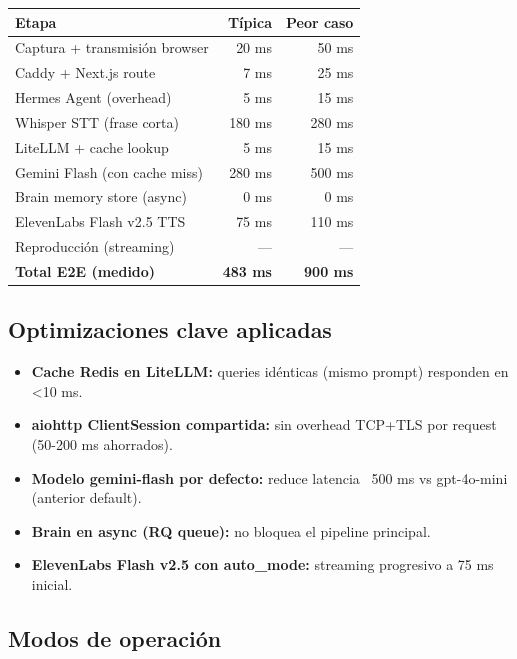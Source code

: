 \documentclass[11pt,a4paper]{article}
\begin{document}
\begin{center}
\begin{tabular}{|l|r|r|}
\hline
\rowcolor{hermesblue}\color{white}\textbf{Etapa} & \color{white}\textbf{Típica} & \color{white}\textbf{Peor caso}\\
\hline
Captura + transmisión browser & 20 ms & 50 ms\\
Caddy + Next.js route & 7 ms & 25 ms\\
Hermes Agent (overhead) & 5 ms & 15 ms\\
Whisper STT (frase corta) & 180 ms & 280 ms\\
LiteLLM + cache lookup & 5 ms & 15 ms\\
Gemini Flash (con cache miss) & 280 ms & 500 ms\\
Brain memory store (async) & 0 ms & 0 ms\\
ElevenLabs Flash v2.5 TTS & 75 ms & 110 ms\\
Reproducción (streaming) & — & —\\
\hline
\rowcolor{okbg}\textbf{Total E2E (medido)} & \textbf{483 ms} & \textbf{~900 ms}\\
\hline
\end{tabular}
\end{center}

\subsection{Optimizaciones clave aplicadas}

\begin{itemize}[leftmargin=*,itemsep=1pt]
\item \textbf{Cache Redis en LiteLLM:} queries idénticas (mismo prompt) responden en \textless 10 ms.
\item \textbf{aiohttp ClientSession compartida:} sin overhead TCP+TLS por request (50-200 ms ahorrados).
\item \textbf{Modelo gemini-flash por defecto:} reduce latencia ~500 ms vs gpt-4o-mini (anterior default).
\item \textbf{Brain en async (RQ queue):} no bloquea el pipeline principal.
\item \textbf{ElevenLabs Flash v2.5 con auto\_mode:} streaming progresivo a 75 ms inicial.
\end{itemize}

\subsection{Modos de operación}
\end{document}
